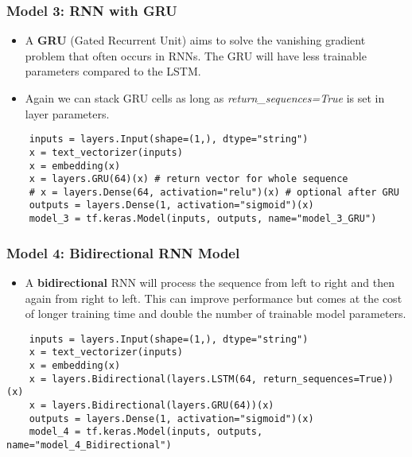 \documentclass[11pt, a4paper]{article}
\begin{document}
	\subsubsection{Model 3: RNN with GRU}
	\begin{itemize}
		\item A \textbf{GRU} (Gated Recurrent Unit) aims to solve the vanishing gradient problem that often occurs in RNNs. The GRU will have less trainable parameters compared to the LSTM.
		\item Again we can stack GRU cells as long as \textit{return\_sequences=True} is set in layer parameters.
	\end{itemize}
	\begin{lstlisting}
	inputs = layers.Input(shape=(1,), dtype="string")
	x = text_vectorizer(inputs)
	x = embedding(x) 
	x = layers.GRU(64)(x) # return vector for whole sequence
	# x = layers.Dense(64, activation="relu")(x) # optional after GRU
	outputs = layers.Dense(1, activation="sigmoid")(x)
	model_3 = tf.keras.Model(inputs, outputs, name="model_3_GRU") \end{lstlisting} 

	\subsubsection{Model 4: Bidirectional RNN Model}
	\begin{itemize}
		\item A \textbf{bidirectional} RNN will process the sequence from left to right and then again from right to left. This can improve performance but comes at the cost of longer training time and double the number of trainable model parameters.
	\end{itemize}
	\begin{lstlisting}
	inputs = layers.Input(shape=(1,), dtype="string")
	x = text_vectorizer(inputs)
	x = embedding(x)
	x = layers.Bidirectional(layers.LSTM(64, return_sequences=True))(x)
	x = layers.Bidirectional(layers.GRU(64))(x)
	outputs = layers.Dense(1, activation="sigmoid")(x)
	model_4 = tf.keras.Model(inputs, outputs, name="model_4_Bidirectional") \end{lstlisting}
\end{document}
